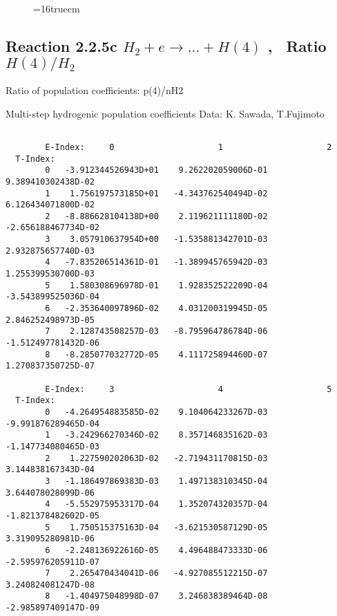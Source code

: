\documentclass[12pt,dvipdfmx]{article}
\begin{document}
{\begin{small}
\begin{verbatim}
\end{verbatim}\end{small}
\begin{figure} \label{2.2.5b}
\epsfxsize=16truecm
\end{figure}
\newpage

\subsection{
Reaction 2.2.5c  $H_2 + e \rightarrow ...+ H(4) $ , \   Ratio $H(4)/H_2 $
}

 Ratio of population coefficients: p(4)/nH2

 Multi-step hydrogenic population coefficients
 Data: K. Sawada, T.Fujimoto \cite{kn:Sawada}

\begin{small}\begin{verbatim}

        E-Index:     0                     1                     2
  T-Index:
        0   -3.912344526943D+01    9.262202059006D-01    9.389410302438D-02
        1    1.756197573185D+01   -4.343762540494D-02    6.126434071800D-02
        2   -8.886628104138D+00    2.119621111180D-02   -2.656188467734D-02
        3    3.057910637954D+00   -1.535881342701D-03    2.932875657740D-03
        4   -7.835206514361D-01   -1.389945765942D-03    1.255399530700D-03
        5    1.580308696978D-01    1.928352522209D-04   -3.543899525036D-04
        6   -2.353640097896D-02    4.031200319945D-05    2.846252498973D-05
        7    2.128743508257D-03   -8.795964786784D-06   -1.512497781432D-06
        8   -8.285077032772D-05    4.111725894460D-07    1.270837350725D-07

        E-Index:     3                     4                     5
  T-Index:
        0   -4.264954883585D-02    9.104064233267D-03   -9.991876289465D-04
        1   -3.242966270346D-02    8.357146835162D-03   -1.147734080465D-03
        2    1.227590202063D-02   -2.719431170815D-03    3.144838167343D-04
        3   -1.186497869383D-03    1.497138310345D-04    3.644078028099D-06
        4   -5.552975953317D-04    1.352074320357D-04   -1.821378482602D-05
        5    1.750515375163D-04   -3.621530587129D-05    3.319095280981D-06
        6   -2.248136922616D-05    4.496488473333D-06   -2.595976205911D-07
        7    2.265470434041D-06   -4.927085512215D-07    3.240824081247D-08
        8   -1.404975048998D-07    3.246838389464D-08   -2.985897409147D-09


\end{verbatim}
\end{small}}
\end{document}
